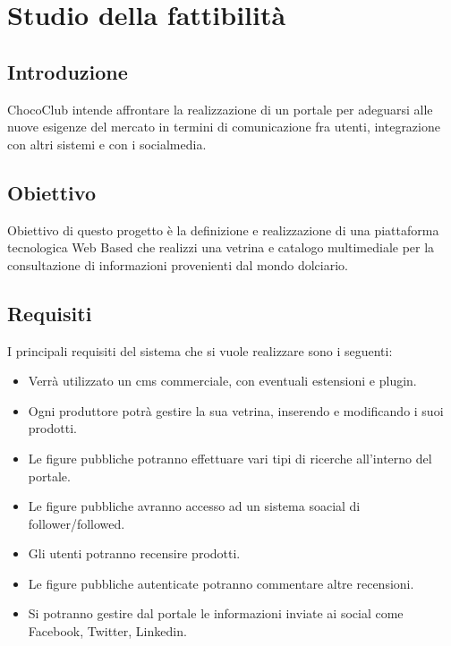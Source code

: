\chapter{Studio della fattibilità} %
\label{cha:studio_della_fattibilita}

\section{Introduzione} 
\label{sec:realizzabilita_sistema}
ChocoClub intende affrontare la realizzazione di un portale per adeguarsi alle nuove esigenze del mercato in 
termini di comunicazione fra utenti, integrazione con altri sistemi e con i socialmedia.

\section{Obiettivo} 
\label{sec:obiettivo}
Obiettivo di questo progetto è la definizione e realizzazione di una piattaforma tecnologica Web Based
che realizzi una vetrina e catalogo multimediale per la consultazione di informazioni provenienti dal mondo dolciario.

\section{Requisiti} 
\label{sec:requisiti}
I principali requisiti del sistema che si vuole realizzare sono i seguenti:
\begin{itemize}
	\item Verrà utilizzato un \gls{cms} commerciale, con eventuali estensioni e plugin.

	\item Ogni produttore potrà gestire la sua vetrina, inserendo e modificando i suoi prodotti.

	\item Le figure pubbliche potranno effettuare vari tipi di ricerche all'interno del portale. 

	\item Le figure pubbliche avranno accesso ad un sistema soacial di follower/followed.

	\item Gli utenti potranno recensire prodotti.

	\item Le figure pubbliche autenticate potranno commentare altre recensioni.



	\item Si potranno gestire dal portale le informazioni inviate ai social come Facebook, Twitter, Linkedin.
\end{itemize}



